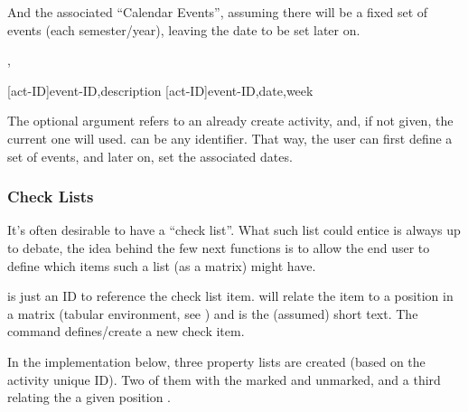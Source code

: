 \documentclass[10pt]{article}
\begin{document}


And the associated ``Calendar Events'', assuming there will be a fixed set of events (each semester/year), leaving the date to be set later on. 

\begin{codedescribe}{\ActivitySetNewEvent,\ActivitySetEventDay}
\begin{codesyntax}
  \tsmacro{\ActivitySetNewEvent}[act-ID]{event-ID,description}
  \tsmacro{\ActivitySetEventDay}[act-ID]{event-ID,date,week}
\end{codesyntax}
The optional argument  refers to an already create activity, and, if not given, the current one will used.  can be any identifier. That way, the user can first define a set of events, and later on, set the associated dates.
\end{codedescribe}








\subsubsection{Check Lists}\label{Activity-checklist}

It's often desirable to have a ``check list''. What such list could entice is always up to debate, the idea behind the few next functions is to allow the end user to define which items such a list (as a matrix) might have.

\begin{codedescribe}{\checkdef}
\begin{codesyntax}
\end{codesyntax}
   is just an ID to reference the check list item.  will relate the item to a position in a matrix (tabular environment, see \tsobj{\StudentCheckListTable}) and  is the (assumed) short text.
  The command \tsobj{\checkdef} defines/create a new check item.
\end{codedescribe}
\begin{tsremark}
  In the implementation below, three property lists are created (based on the activity unique ID). Two of them with the  marked and unmarked, and a third relating the  a given position .
\end{tsremark}
\end{document}
